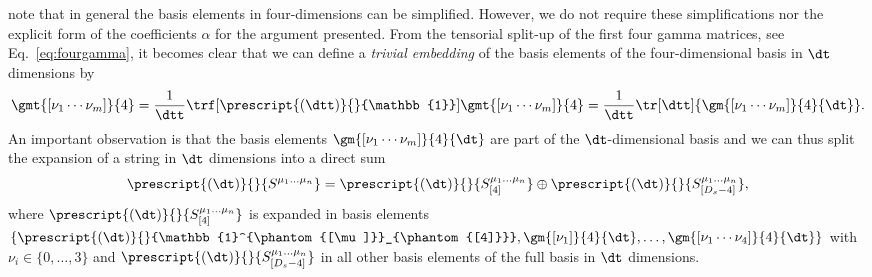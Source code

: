 note that in general the basis elements in four-dimensions can be
simplified. However, we do not require these simplifications nor the
explicit form of the coefficients $\alpha$ for the argument
presented. From
the tensorial split-up of the first four gamma matrices, see Eq.~\eqref{eq:fourgamma}, it becomes clear
that we can define a \textit{trivial embedding} of the basis elements of the
four-dimensional basis in $\dt$ dimensions by
\begin{align}\label{eq:embedldhd}
  \gmt{[\nu_1\cdots \nu_m]}{4} = \frac{1}{\dtt}\trf[\prescript{(\dtt)}{}{\mathbb{1}}]{\gmt{[\nu_1\cdots\nu_m]}{4}} = \frac{1}{\dtt}\tr[\dtt]{\gm{[\nu_1\cdots\nu_m]}{4}{\dt}}.
\end{align}
An important observation is that the basis elements $\gm{[\nu_1\cdots\nu_m]}{4}{\dt}$ are part of the
$\dt$-dimensional basis and we can thus split the expansion of a
string in $\dt$ dimensions into a direct sum
\begin{align}\label{eq:expslplit}
    \prescript{(\dt)}{}{S^{\mu_1\ldots \mu_n}} =
    \prescript{(\dt)}{}{S_{[4]}^{\mu_1\ldots \mu_n}} \oplus \prescript{(\dt)}{}{S_{[D_s-4]}^{\mu_1\ldots \mu_n}},
\end{align}
where $\prescript{(\dt)}{}{S_{[4]}^{\mu_1\ldots\mu_n}}$ is expanded in
basis elements
$\left\{\prescript{(\dt)}{}{\mathbb{1}^{\phantom{[\mu]}}_{\phantom{[4]}}},\gm{[\nu_1]}{4}{\dt},\ldots,\gm{[\nu_1\cdots\nu_4]}{4}{\dt}\right\}$
with $\nu_i \in \{0,\ldots, 3\}$ and
$\prescript{(\dt)}{}{S_{[D_s-4]}^{\mu_1\ldots \mu_n}}$ in all other
basis elements of the full basis in $\dt$ dimensions.

